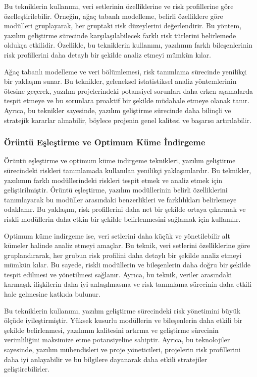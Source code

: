 \documentclass{article}
\begin{document}
Bu tekniklerin kullanımı, veri setlerinin özelliklerine ve risk profillerine göre özelleştirilebilir. Örneğin, ağaç tabanlı modelleme, belirli özelliklere göre modülleri gruplayarak, her gruptaki risk düzeylerini değerlendirir. Bu yöntem, yazılım geliştirme sürecinde karşılaşılabilecek farklı risk türlerini belirlemede oldukça etkilidir. Özellikle, bu tekniklerin kullanımı, yazılımın farklı bileşenlerinin risk profillerini daha detaylı bir şekilde analiz etmeyi mümkün kılar.

Ağaç tabanlı modelleme ve veri bölümlemesi, risk tanımlama sürecinde yenilikçi bir yaklaşım sunar. Bu teknikler, geleneksel istatistiksel analiz yöntemlerinin ötesine geçerek, yazılım projelerindeki potansiyel sorunları daha erken aşamalarda tespit etmeye ve bu sorunlara proaktif bir şekilde müdahale etmeye olanak tanır. Ayrıca, bu teknikler sayesinde, yazılım geliştirme sürecinde daha bilinçli ve stratejik kararlar alınabilir, böylece projenin genel kalitesi ve başarısı artırılabilir.


\subsubsection{Örüntü Eşleştirme ve Optimum Küme İndirgeme}

Örüntü eşleştirme ve optimum küme indirgeme teknikleri, yazılım geliştirme sürecindeki riskleri tanımlamada kullanılan yenilikçi yaklaşımlardır. Bu teknikler, yazılımın farklı modüllerindeki riskleri tespit etmek ve analiz etmek için geliştirilmiştir. Örüntü eşleştirme, yazılım modüllerinin belirli özelliklerini tanımlayarak bu modüller arasındaki benzerlikleri ve farklılıkları belirlemeye odaklanır. Bu yaklaşım, risk profillerini daha net bir şekilde ortaya çıkarmak ve riskli modüllerin daha etkin bir şekilde belirlenmesini sağlamak için kullanılır.

Optimum küme indirgeme ise, veri setlerini daha küçük ve yönetilebilir alt kümeler halinde analiz etmeyi amaçlar. Bu teknik, veri setlerini özelliklerine göre gruplandırarak, her grubun risk profilini daha detaylı bir şekilde analiz etmeyi mümkün kılar. Bu sayede, riskli modüllerin ve bileşenlerin daha doğru bir şekilde tespit edilmesi ve yönetilmesi sağlanır. Ayrıca, bu teknik, veriler arasındaki karmaşık ilişkilerin daha iyi anlaşılmasına ve risk tanımlama sürecinin daha etkili hale gelmesine katkıda bulunur.

Bu tekniklerin kullanımı, yazılım geliştirme sürecindeki risk yönetimini büyük ölçüde iyileştirmiştir. Yüksek kusurlu modüllerin ve bileşenlerin daha etkili bir şekilde belirlenmesi, yazılımın kalitesini artırma ve geliştirme sürecinin verimliliğini maksimize etme potansiyeline sahiptir. Ayrıca, bu teknolojiler sayesinde, yazılım mühendisleri ve proje yöneticileri, projelerin risk profillerini daha iyi anlayabilir ve bu bilgilere dayanarak daha etkili stratejiler geliştirebilirler.
\end{document}
